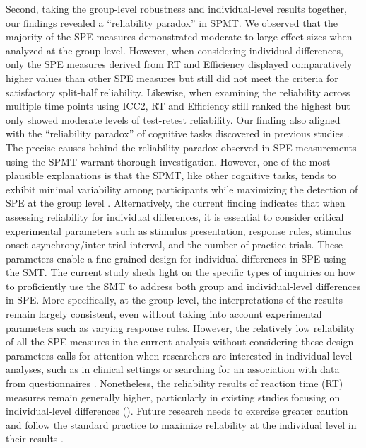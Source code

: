 \documentclass[sn-apa]{sn-jnl}%
\theoremstyle{thmstyleone}%
\theoremstyle{thmstyletwo}%
\theoremstyle{thmstylethree}%
\begin{document}
Second, taking the group-level robustness and individual-level results together, our findings revealed a ``reliability paradox” in SPMT. We observed that the majority of the SPE measures demonstrated moderate to large effect sizes when analyzed at the group level. However, when considering individual differences, only the SPE measures derived from RT and Efficiency displayed comparatively higher values than other SPE measures but still did not meet the criteria for satisfactory split-half reliability. Likewise, when examining the reliability across multiple time points using ICC2, RT and Efficiency still ranked the highest but only showed moderate levels of test-retest reliability. Our finding also aligned with the “reliability paradox” of cognitive tasks discovered in previous studies \parencite{hedge2018reliability,enkavi2019large}. The precise causes behind the reliability paradox observed in SPE measurements using the SPMT warrant thorough investigation. However, one of the most plausible explanations is that the SPMT, like other cognitive tasks, tends to exhibit minimal variability among participants while maximizing the detection of SPE at the group level \parencite{liljequist2019intraclass}. Alternatively, the current finding indicates that when assessing reliability for individual differences, it is essential to consider critical experimental parameters such as stimulus presentation, response rules, stimulus onset asynchrony/inter-trial interval, and the number of practice trials. These parameters enable a fine-grained design for individual differences in SPE using the SMT. The current study sheds light on the specific types of inquiries on how to proficiently use the SMT to address both group and individual-level differences in SPE. More specifically, at the group level, the interpretations of the results remain largely consistent, even without taking into account experimental parameters such as varying response rules. However, the relatively low reliability of all the SPE measures in the current analysis without considering these design parameters calls for attention when researchers are interested in individual-level analyses, such as in clinical settings or searching for an association with data from questionnaires \parencite[e.g.,][]{hobbs2023self,moseley2022levels}. Nonetheless, the reliability results of reaction time (RT) measures remain generally higher, particularly in existing studies focusing on individual-level differences (\parencite[e.g.,][]{liu2022depression,zhang2023decoding}). Future research needs to exercise greater caution and follow the standard practice to maximize reliability at the individual level in their results \parencite{parsons2019psychological}.
\end{document}
